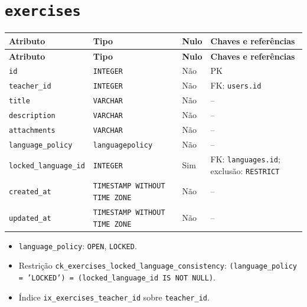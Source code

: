 \section*{\texttt{exercises}}
\begingroup\footnotesize
\setlength{\tabcolsep}{4pt}\renewcommand{\arraystretch}{1.15}
\begin{longtable}{|>{\raggedright\arraybackslash}p{}|>{\raggedright\arraybackslash}p{}|>{\raggedright\arraybackslash}p{}|>{\raggedright\arraybackslash}p{}|}
\hline
\textbf{Atributo} & \textbf{Tipo} & \textbf{Nulo} & \textbf{Chaves e referências} \\ \hline
\endfirsthead
\hline \textbf{Atributo} & \textbf{Tipo} & \textbf{Nulo} & \textbf{Chaves e referências} \\ \hline
\endhead
\texttt{id} & \texttt{INTEGER} & Não & PK \\ \hline
\texttt{teacher\_\allowbreak{}id} & \texttt{INTEGER} & Não & FK: \texttt{users.id} \\ \hline
\texttt{title} & \texttt{VARCHAR} & Não & -- \\ \hline
\texttt{description} & \texttt{VARCHAR} & Não & -- \\ \hline
\texttt{attachments} & \texttt{VARCHAR} & Não & -- \\ \hline
\texttt{language\_\allowbreak{}policy} & \texttt{languagepolicy} & Não & -- \\ \hline
\texttt{locked\_\allowbreak{}language\_\allowbreak{}id} & \texttt{INTEGER} & Sim & FK: \texttt{languages.id}; exclusão: \texttt{RESTRICT} \\ \hline
\texttt{created\_\allowbreak{}at} & \texttt{TIMESTAMP WITHOUT TIME ZONE} & Não & -- \\ \hline
\texttt{updated\_\allowbreak{}at} & \texttt{TIMESTAMP WITHOUT TIME ZONE} & Não & -- \\ \hline
\end{longtable}
\begin{itemize}
\item \texttt{language\_\allowbreak{}policy}: \texttt{OPEN}, \texttt{LOCKED}.
\item Restrição \texttt{ck\_\allowbreak{}exercises\_\allowbreak{}locked\_\allowbreak{}language\_\allowbreak{}consistency}: \texttt{(language\_\allowbreak{}policy = 'LOCKED') = (locked\_\allowbreak{}language\_\allowbreak{}id IS NOT NULL)}.
\item Índice \texttt{ix\_\allowbreak{}exercises\_\allowbreak{}teacher\_\allowbreak{}id} sobre \texttt{teacher\_\allowbreak{}id}.
\end{itemize}
\endgroup


